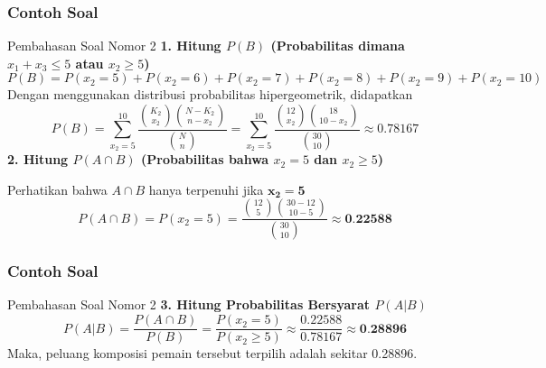 \documentclass[]{beamer}
\begin{document}
\begin{frame}
    \frametitle{Contoh Soal}
    \scriptsize
    \begin{exampleblock}{Pembahasan Soal Nomor 2}
    \textbf{1. Hitung $P(B)$ (Probabilitas dimana $x_1 + x_3 \le 5$ atau $x_2 \ge 5$)}
    \begin{equation*}
        P(B) = P(x_2=5) + P(x_2=6) + P(x_2=7) + P(x_2=8) + P(x_2=9) + P(x_2=10)
    \end{equation*}
    Dengan menggunakan distribusi probabilitas hipergeometrik, didapatkan
    \begin{equation*}
        P(B) = \sum_{x_2=5}^{10} \frac{\binom{K_2}{x_2} \binom{N-K_2}{n-x_2}}{\binom{N}{n}} = \sum_{x_2=5}^{10} \frac{\binom{12}{x_2} \binom{18}{10-x_2}}{\binom{30}{10}} \approx \mathbf{0.78167}
    \end{equation*}
    \textbf{2. Hitung $P(A \cap B)$ (Probabilitas bahwa $x_2=5$ dan $x_2 \ge 5$)}


    Perhatikan bahwa $A \cap B$ hanya terpenuhi jika $\mathbf{x_2 = 5}$
    \begin{equation*}
        P(A\cap B) = P(x_2=5) = \frac{\binom{12}{5} \binom{30-12}{10-5}}{\binom{30}{10}} \approx \textbf{0.22588}
    \end{equation*}
    \end{exampleblock}
\end{frame}

\begin{frame}
    \frametitle{Contoh Soal}
    \scriptsize
    \begin{exampleblock}{Pembahasan Soal Nomor 2}
        \textbf{3. Hitung Probabilitas Bersyarat $P(A|B)$}
        \begin{equation*}
        P(A|B) = \frac{P(A\cap B)}{P(B)} = \frac{P(x_2=5)}{P(x_2\ge5)} \approx \frac{0.22588}{0.78167} \approx \textbf{0.28896}
        \end{equation*}
        Maka, peluang komposisi pemain tersebut terpilih adalah sekitar 0.28896.
    \end{exampleblock}
\end{frame}
\end{document}
